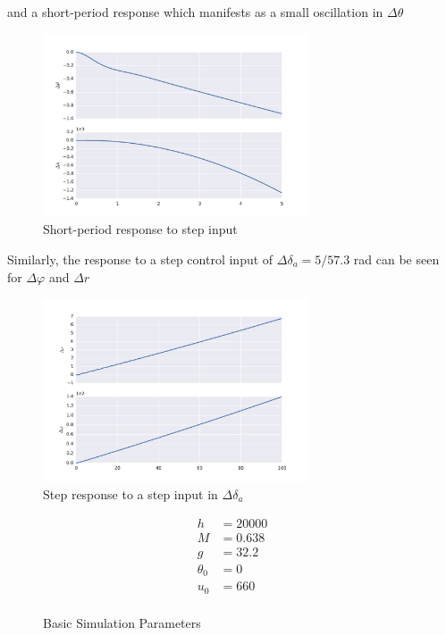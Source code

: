 \documentclass[12pt]{article}
\begin{document}
\noindent and a short-period response which manifests as a small oscillation in $\Delta \theta$
\begin{figure}[h!]
\begin{center}
\includegraphics[width=0.7\textwidth]{figures/LongStepShort.pdf}
\caption{Short-period response to step input}
\label{}
\end{center}
\end{figure}

\clearpage
\noindent Similarly, the response to a step control input of $\Delta \delta_a = 5/57.3$ rad can be seen for $\Delta \varphi$ and $\Delta r$
\begin{figure}[h!]
\begin{center}
\includegraphics[width=0.7\textwidth]{figures/LatStep.pdf}
\caption{Step response to a step input in $\Delta \delta_a$}
\label{}
\end{center}
\end{figure}

\newpage
\appendix

\begin{figure}
\begin{equation*}
  \begin{split}
  h &= 20000 \\
  M &= 0.638 \\
  g &= 32.2 \\
  \theta_0 &= 0 \\
  u_0 &= 660 \\
  \end{split}
\end{equation*}
  \caption{Basic Simulation Parameters}
\end{figure}
\end{document}

